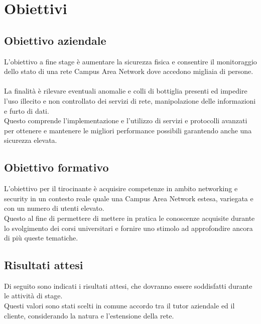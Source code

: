 \documentclass[Tesi.tex]{subfiles}
\begin{document}
\newpage

\clearpage\thispagestyle{empty}\mbox{}\clearpage
\newpage

\chapter{Obiettivi}
\section{Obiettivo aziendale}
L'obiettivo a fine stage è aumentare la sicurezza fisica e consentire il monitoraggio dello stato di una rete Campus Area Network dove accedono migliaia di persone. \\\\
La finalità è rilevare eventuali anomalie e colli di bottiglia presenti ed impedire l'uso illecito e non controllato dei servizi di rete, manipolazione delle informazioni e furto di dati. \\
Questo comprende l'implementazione e l'utilizzo di servizi e protocolli avanzati per ottenere e mantenere le migliori performance possibili garantendo anche una sicurezza elevata.

\section{Obiettivo formativo}
L'obiettivo per il tirocinante è acquisire competenze in ambito networking e security in un contesto reale quale una Campus Area Network estesa, variegata e con un numero di utenti elevato. \\
Questo al fine di permettere di mettere in pratica le conoscenze acquisite durante lo svolgimento dei corsi universitari e fornire uno stimolo ad approfondire ancora di più queste tematiche.

\newpage
\section{Risultati attesi}
Di seguito sono indicati i risultati attesi, che dovranno essere soddisfatti durante le attività di stage. \\
Questi valori sono stati scelti in comune accordo tra il tutor aziendale ed il cliente, considerando la natura e l'estensione della rete.
\end{document}
